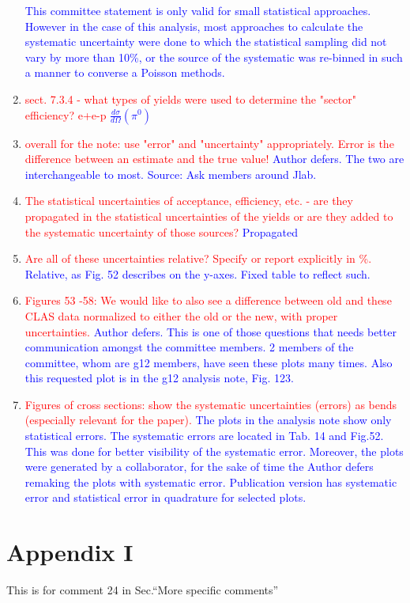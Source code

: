 \documentclass[11pt,a4paper]{article}
\begin{document}
\begin{enumerate}
\textcolor{blue}{This committee statement is only valid for small statistical approaches. However in the case of this analysis, most approaches to calculate the systematic uncertainty were done to which the statistical sampling did not vary by more than 10\%, or the source of the systematic was re-binned in such a manner to converse a Poisson methods.}
\item
\textcolor{red}{sect. 7.3.4 - what types of yields were used to determine the "sector" efficiency? e+e-p\newline}
\textcolor{blue}{$\frac{d\sigma}{d\Omega}(\pi^{0})$}
\item
\textcolor{red}{overall for the note: use "error" and "uncertainty" appropriately. Error is the difference between an estimate and the true value!}
\textcolor{blue}{Author defers. The two are interchangeable to most. Source: Ask members around Jlab.}
\item
\textcolor{red}{ The statistical uncertainties of acceptance, efficiency, etc. - are they propagated in the statistical uncertainties of the yields or are they added to the systematic uncertainty of those sources?}
\textcolor{blue}{Propagated}
\item
\textcolor{red}{Are all of these uncertainties relative? Specify or report explicitly in \%.}
\textcolor{blue}{Relative, as Fig. 52 describes on the y-axes. Fixed table to reflect such.}
\item
\textcolor{red}{ Figures 53 -58: We would like to also see a difference between old and these CLAS data normalized to either the old or the new, with proper uncertainties.}
\textcolor{blue}{Author defers. This is one of those questions that needs better communication amongst the committee members. 2 members of the committee, whom are g12 members, have seen these plots many times. Also this requested plot is in the g12 analysis note, Fig. 123.}
\item
\textcolor{red}{Figures of cross sections: show the systematic uncertainties (errors) as bends (especially relevant for the paper).}
\textcolor{blue}{The plots in the analysis note show only statistical errors. The systematic errors are located in Tab. 14 and Fig.52. This was done for better visibility of the systematic error. Moreover, the plots were generated by a collaborator, for the sake of time the Author defers remaking the plots with systematic error. Publication version has systematic error and statistical error in quadrature for selected plots.}
\end{enumerate}
\section{Appendix I}
This is for comment 24 in Sec.``More specific comments''

\end{document}
